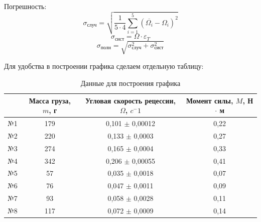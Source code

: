 \documentclass[a4paper]{article}
\begin{document}
Погрешность:
    \[\sigma_{\text{случ}} = \sqrt{\frac{1}{5 \cdot 4}\sum\limits_{i=1}^{5} (\overline{\Omega_{i}} - \Omega_{i})^2}\]
    \[\sigma_{\text{сист}} = \Omega \cdot \varepsilon_{T}\]
    \[\sigma_{\text{полн}} = \sqrt{\sigma_{\text{случ}}^2 + \sigma_{\text{сист}}^2}\]
    

Для удобства в построении графика сделаем отдельную таблицу:

\begin{table}[!h]
    \begin{center}
    \begin{tabular}{|c|c|c|c|}
    \hline
       & Масса груза, $m$, г & Угловая скорость рецессии, $\Omega$, $c{^-1}$ & Момент силы, $M$, Н $\cdot$ м \\ \hline
    №1 & 179                  & 0,101 $\pm$ 0,00012                                     & 0,22                                                                 \\ \hline
    №2 & 220                 & 0,133  $\pm$ 0,0003                                   & 0,27                                                                 \\ \hline
    №3 & 274                 & 0,165  $\pm$ 0,0004                                     & 0,33                                                                   \\ \hline
    №4 & 342                 & 0,206  $\pm$ 0,00055                                      & 0,41                                                                 \\ \hline
    №5 & 57                 & 0,035 $\pm$ 0,0018                                      & 0,07                                                                   \\ \hline
    №6 & 76                 & 0,047 $\pm$ 0,0011                                      & 0,09                                                                   \\ \hline
    №7 & 93                 & 0,058 $\pm$ 0,0028                                      & 0,11                                                                   \\ \hline
    №8 & 117                 & 0,072 $\pm$ 0,0009                                      & 0,14                                                                   \\ \hline

    \end{tabular}
    \caption{Данные для построения графика}
    \end{center}
    \end{table}
\newpage
\end{document}
